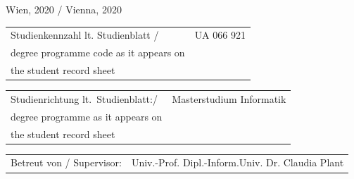 \begin{titlepage}
\noindent\textsf{Wien, 2020 / Vienna, 2020}  %
\vfill

\noindent\begin{tabular}{@{}p{8cm}p{8cm}}
\textsf{Studienkennzahl lt. Studienblatt / }
&
\textsf{UA 066 921} %
\\
\textsf{degree programme code as it appears on}
&
\\
\textsf{the student record sheet}
&
\\
\end{tabular}

\vspace{0.2cm}
\noindent\begin{tabular}{@{}p{8cm}p{8cm}}
\textsf{Studienrichtung lt.\ Studienblatt:/}
&
\textsf{Masterstudium Informatik}  %
\\
\textsf{degree programme as it appears on}
&
\\
\textsf{the student record sheet}
&
\\
\end{tabular}

\vspace{0.2cm}

\noindent\begin{tabular}{@{}p{8cm}p{8cm}}
\textsf{Betreut von / Supervisor:}
&
\textsf{Univ.-Prof. Dipl.-Inform.Univ. Dr. Claudia Plant}  %
\\
\end{tabular}

\end{titlepage}


%
%
%
%

%

